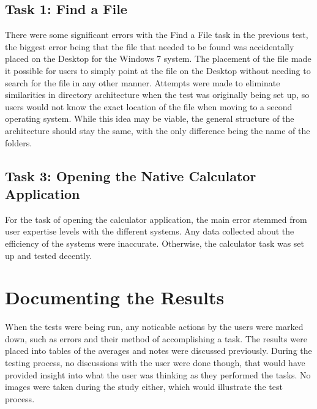 \documentclass[11pt,letterpaper]{report}
\begin{document}
\subsection{Task 1: Find a File}
There were some significant errors with the Find a File task in the previous test, the biggest error being that the file that needed to be found was accidentally placed on the Desktop for the Windows 7 system. The placement of the file made it possible for users to simply point at the file on the Desktop without needing to search for the file in any other manner. Attempts were made to eliminate similarities in directory architecture when the test was originally being set up, so users would not know the exact location of the file when moving to a second operating system. While this idea may be viable, the general structure of the architecture should stay the same, with the only difference being the name of the folders. 

\subsection{Task 3: Opening the Native Calculator Application}
For the task of opening the calculator application, the main error stemmed from user expertise levels with the different systems. Any data collected about the efficiency of the systems were inaccurate. Otherwise, the calculator task was set up and tested decently.

\section{Documenting the Results}
When the tests were being run, any noticable actions by the users were marked down, such as errors and their method of accomplishing a task. The results were placed into tables of the averages and notes were discussed previously. During the testing process, no discussions with the user were done though, that would have provided insight into what the user was thinking as they performed the tasks. No images were taken during the study either, which would illustrate the test process. 
\end{document}
